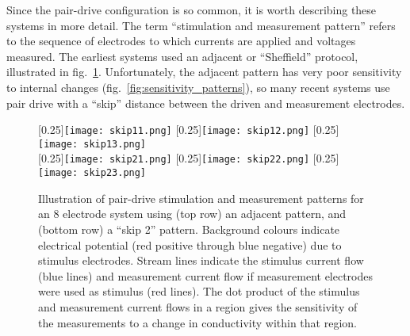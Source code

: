 \documentclass[10pt,journal]{IEEEtran}\def\TBLWIDA{15mm}\def\TBLWIDB{60mm}
\newcommand\fref[1]{fig.\ \ref{#1}}
\begin{document}
Since the pair-drive configuration is so common, it is worth
describing these systems in more detail. The term ``stimulation
and measurement pattern'' refers to the sequence of electrodes
to which currents are applied and voltages measured. The earliest
systems used an adjacent or ``Sheffield'' protocol, illustrated
in \fref{fig:stim_meas_patterns}. Unfortunately, the adjacent
pattern has very poor sensitivity to internal changes \cite{Adler2011Adjacent}
(\fref{fig:sensitivity_patterns}), so many recent systems use pair drive
with a ``skip'' distance between the driven and measurement electrodes.

\begin{figure} \centering
   [0.25\columnwidth]{\texttt{[image: skip11.png]}}\hfil%
   [0.25\columnwidth]{\texttt{[image: skip12.png]}}\hfil%
   [0.25\columnwidth]{\texttt{[image: skip13.png]}}\\
   [0.25\columnwidth]{\texttt{[image: skip21.png]}}\hfil
   [0.25\columnwidth]{\texttt{[image: skip22.png]}}\hfil
   [0.25\columnwidth]{\texttt{[image: skip23.png]}}\\
\caption{%
Illustration of pair-drive stimulation and measurement patterns for an 8
   electrode system using (top row) an adjacent pattern, and (bottom row) a
   ``skip 2'' pattern. Background colours indicate electrical potential (red positive through blue negative)
   due to stimulus electrodes. Stream lines indicate the stimulus current flow
   (blue lines) and measurement current flow if measurement electrodes were
   used as stimulus (red lines). The dot product of the stimulus and
   measurement current flows in a region gives the sensitivity of the measurements
   to a change in conductivity within that region.
}
\label{fig:stim_meas_patterns}
\end{figure}
\end{document}

